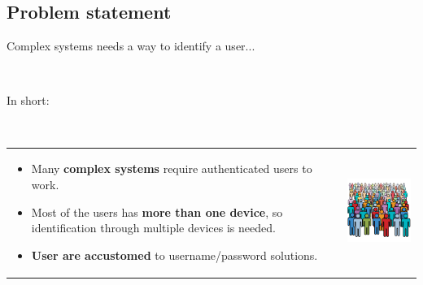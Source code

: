 \documentclass[12pt]{beamer}
\renewcommand{\frametitle}[1]{\vspace{0.2cm}\begin{huge}#1\end{huge}\\}
\renewcommand{\framesubtitle}[1]{\vspace{0.4cm} \hspace{0.4cm}\begin{large}#1\end{large}\\}
\begin{document}
  \subsection{Problem statement}
  \begin{frame}
  \frametitle{Complex systems needs a way to identify a user...}
  \framesubtitle{In short:}
  \begin{table}
  \begin{tabular}{p{7cm}p{3cm}}
  \begin{itemize}
    \item Many \textbf{complex systems} require authenticated users to work.
    \item Most of the users has \textbf{more than one device}, so identification through
      multiple devices is needed.
    \item \textbf{User are accustomed} to username/password solutions.
  \end{itemize}
  &
  \vspace{1.5cm}
  \includegraphics[width=4cm]{../../presentacion/img/users}\\
  \end{tabular}
  \end{table}
  \end{frame}
  
\end{document}
